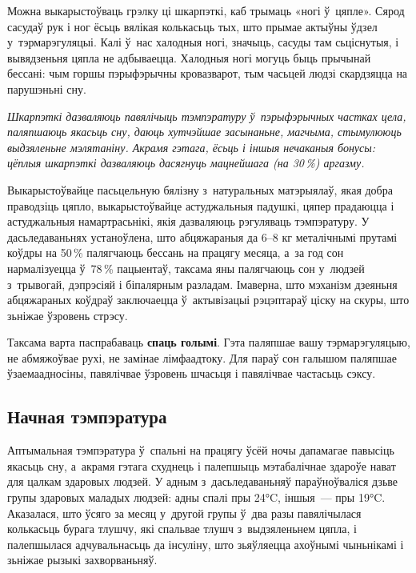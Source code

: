 
Можна выкарыстоўваць грэлку ці шкарпэткі, каб трымаць «ногі ў~цяпле». Сярод сасудаў рук і ног ёсьць вялікая колькасьць тых, што прымае актыўны ўдзел у~тэрмарэгуляцыі. Калі ў~нас халодныя ногі, значыць, сасуды там сьціснутыя, і вывядзеньня цяпла не адбываецца. Халодныя ногі могуць быць прычынай бессані: чым горшы пэрыфэрычны кровазварот, тым часьцей людзі скардзяцца на парушэньні сну.

\emph{Шкарпэткі дазваляюць павялічыць тэмпэратуру ў~пэрыфэрычных частках цела, паляпшаюць якасьць сну, даюць хутчэйшае засынаньне, магчыма, стымулююць выдзяленьне мэлятаніну. Акрамя гэтага, ёсьць і іншыя нечаканыя бонусы: цёплыя шкарпэткі дазваляюць дасягнуць мацнейшага (на 30\,\%) аргазму.}

Выкарыстоўвайце пасьцельную бялізну з~натуральных матэрыялаў, якая добра праводзіць цяпло, выкарыстоўвайце астуджальныя падушкі, цяпер прадаюцца і астуджальныя намартрасьнікі, якія дазваляюць рэгуляваць тэмпэратуру. У дасьледаваньнях устаноўлена, што абцяжараныя да 6--8 кг металічнымі прутамі коўдры на 50\,\% палягчаюць бессань на працягу месяца, а~за год сон нармалізуецца ў~78\,\% пацыентаў, таксама яны палягчаюць сон у~людзей з~трывогай, дэпрэсіяй і біпалярным разладам. Імаверна, што мэханізм дзеяньня абцяжараных коўдраў заключаецца ў~актывізацыі рэцэптараў ціску на скуры, што зьніжае ўзровень стрэсу.

Таксама варта паспрабаваць \textbf{спаць голымі}. Гэта паляпшае вашу тэрмарэгуляцыю, не абмяжоўвае рухі, не замінае лімфаадтоку. Для параў сон галышом паляпшае ўзаемаадносіны, павялічвае ўзровень шчасьця і павялічвае частасьць сэксу.

\subsection*{Начная тэмпэратура}

Аптымальная тэмпэратура ў~спальні на працягу ўсёй ночы дапамагае павысіць якасьць сну, а~акрамя гэтага схуднець і палепшыць мэтабалічнае здароўе нават для цалкам здаровых людзей. У адным з~дасьледаваньняў параўноўваліся дзьве групы здаровых маладых людзей: адны спалі пры 24°C, іншыя~--- пры 19°C. Аказалася, што ўсяго за месяц у~другой групы ў~два разы павялічылася колькасьць бурага тлушчу, які спальвае тлушч з~выдзяленьнем цяпла, і палепшылася адчувальнасьць да інсуліну, што зьяўляецца ахоўнымі чыньнікамі і зьніжае рызыкі захворваньняў.

